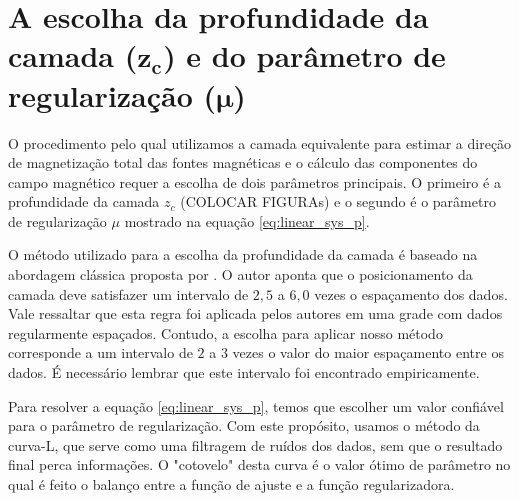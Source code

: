 \section{A escolha da profundidade da camada ($\mathbf{z_{c}}$) e do parâmetro de regularização ($\mathbf{\mu}$)}

O procedimento pelo qual utilizamos a camada equivalente para estimar a direção de magnetização total das fontes magnéticas e o cálculo das componentes do campo magnético requer a escolha de dois parâmetros principais. O primeiro é a profundidade da camada $z_c$ (COLOCAR FIGURAs) e o segundo é o parâmetro de regularização $\mu$ mostrado na equação \ref{eq:linear_sys_p}. 

O método utilizado para a escolha da profundidade da camada é baseado na abordagem clássica proposta por \cite{dampney1969}. O autor aponta que o posicionamento da camada deve satisfazer um intervalo de $2,5$ a $6,0$ vezes o espaçamento dos dados. Vale ressaltar que esta regra foi aplicada pelos autores em uma grade com dados regularmente espaçados. Contudo, a escolha para aplicar nosso método corresponde a um intervalo de $2$ a $3$ vezes o valor do maior espaçamento entre os dados. É necessário lembrar que este intervalo foi encontrado empiricamente. 

Para resolver a equação \ref{eq:linear_sys_p}, temos que escolher um valor confiável para o parâmetro de regularização. Com este propósito, usamos o método da curva-L, que serve como uma filtragem de ruídos dos dados, sem que o resultado final perca informações. O "cotovelo" desta curva é o valor ótimo de parâmetro no qual é feito o balanço entre a função de ajuste e a função regularizadora. 

